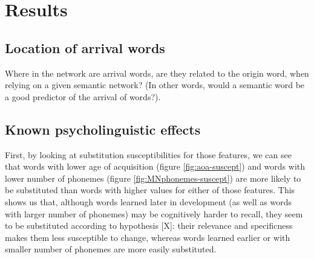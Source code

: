 \section{Results}\label{sec:results}



\subsection{Location of arrival words} 

Where in the network are arrival words, are they related to the origin word, when relying on a given semantic network?  (In other words, would a semantic word be a good predictor of the arrival of words?). 


\subsection{Known psycholinguistic effects}

  First, by looking at substitution susceptibilities for those features, we can see that words with lower age of acquisition (figure \ref{fig:aoa-suscept}) and words with lower number of phonemes (figure \ref{fig:MNphonemes-suscept}) are more likely to be substituted than words with higher values for either of those features. This shows us that, although words learned later in development (as well as words with larger number of phonemes) may be cognitively harder to recall, they seem to be substituted according to hypothesis [X]: their relevance and specificness makes them less susceptible to change, whereas words learned earlier or with smaller number of phonemes are more easily substituted.

